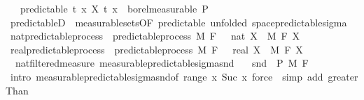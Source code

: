 \begin{isabellebody}
\ \ \ predictable{\isacharcolon}{\kern0pt}\ {\isachardoublequoteopen}{\isacharparenleft}{\kern0pt}{\isasymlambda}{\isacharparenleft}{\kern0pt}t{\isacharcomma}{\kern0pt}\ x{\isacharparenright}{\kern0pt}{\isachardot}{\kern0pt}\ X\ t\ x{\isacharparenright}{\kern0pt}\ {\isasymin}\ borel{\isacharunderscore}{\kern0pt}measurable\ {\isasymSigma}\isactrlsub P{\isachardoublequoteclose}\isanewline
{}\isanewline
\isanewline
{}\isamarkupfalse%
\ predictableD\ {\isacharequal}{\kern0pt}\ measurable{\isacharunderscore}{\kern0pt}sets{\isacharbrackleft}{\kern0pt}OF\ predictable{\isacharcomma}{\kern0pt}\ unfolded\ space{\isacharunderscore}{\kern0pt}predictable{\isacharunderscore}{\kern0pt}sigma{\isacharbrackright}{\kern0pt}\isanewline
\isanewline
{}\isamarkupfalse%
\isanewline
\isanewline
\isanewline
\isanewline
{}\isamarkupfalse%
\ nat{\isacharunderscore}{\kern0pt}predictable{\isacharunderscore}{\kern0pt}process\ {\isacharequal}{\kern0pt}\ predictable{\isacharunderscore}{\kern0pt}process\ M\ F\ {\isachardoublequoteopen}{}\ {\isacharcolon}{\kern0pt}{\isacharcolon}{\kern0pt}\ nat{\isachardoublequoteclose}\ X\ \ M\ F\ X\isanewline
{}\isamarkupfalse%
\ real{\isacharunderscore}{\kern0pt}predictable{\isacharunderscore}{\kern0pt}process\ {\isacharequal}{\kern0pt}\ predictable{\isacharunderscore}{\kern0pt}process\ M\ F\ {\isachardoublequoteopen}{}\ {\isacharcolon}{\kern0pt}{\isacharcolon}{\kern0pt}\ real{\isachardoublequoteclose}\ X\ \ M\ F\ X\isanewline
\isanewline
{}\isamarkupfalse%
\ {\isacharparenleft}{\kern0pt}\ nat{\isacharunderscore}{\kern0pt}filtered{\isacharunderscore}{\kern0pt}measure{\isacharparenright}{\kern0pt}\ measurable{\isacharunderscore}{\kern0pt}predictable{\isacharunderscore}{\kern0pt}sigma{\isacharunderscore}{\kern0pt}snd{\isacharcolon}{\kern0pt}\isanewline
\ \ \ {\isachardoublequoteopen}snd\ {\isasymin}\ {\isasymSigma}\isactrlsub P\ {\isasymrightarrow}\isactrlsub M\ F\ {}{\isachardoublequoteclose}\isanewline
%
\isadelimproof
\ \ %
\endisadelimproof
%
\isatagproof
{}\isamarkupfalse%
\ {\isacharparenleft}{\kern0pt}intro\ measurable{\isacharunderscore}{\kern0pt}predictable{\isacharunderscore}{\kern0pt}sigma{\isacharunderscore}{\kern0pt}snd{\isacharbrackleft}{\kern0pt}of\ {\isachardoublequoteopen}range\ {\isacharparenleft}{\kern0pt}{\isasymlambda}x{\isachardot}{\kern0pt}\ {\isacharbraceleft}{\kern0pt}Suc\ x{\isacharbraceright}{\kern0pt}{\isacharparenright}{\kern0pt}{\isachardoublequoteclose}{\isacharbrackright}{\kern0pt}{\isacharparenright}{\kern0pt}\ {\isacharparenleft}{\kern0pt}force\ {\isacharbar}{\kern0pt}\ simp\ add{\isacharcolon}{\kern0pt}\ greaterThan{\isacharunderscore}{\kern0pt}{}{\isacharparenright}{\kern0pt}{\isacharplus}{\kern0pt}%

\end{isabellebody}
